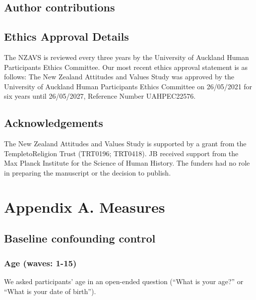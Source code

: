 \documentclass[
  singlecolumn]{report}
\begin{document}
\hypertarget{author-contributions}{%
\subsection{Author contributions}\label{author-contributions}}

\hypertarget{ethics-approval-details}{%
\subsection{Ethics Approval Details}\label{ethics-approval-details}}

The NZAVS is reviewed every three years by the University of Auckland
Human Participants Ethics Committee. Our most recent ethics approval
statement is as follows: The New Zealand Attitudes and Values Study was
approved by the University of Auckland Human Participants Ethics
Committee on 26/05/2021 for six years until 26/05/2027, Reference Number
UAHPEC22576.

\hypertarget{acknowledgements}{%
\subsection{Acknowledgements}\label{acknowledgements}}

The New Zealand Attitudes and Values Study is supported by a grant from
the TempletoReligion Trust (TRT0196; TRT0418). JB received support from
the Max Planck Institute for the Science of Human History. The funders
had no role in preparing the manuscript or the decision to publish.

\newpage{}

\hypertarget{appendix-a.-measures}{%
\section{Appendix A. Measures}\label{appendix-a.-measures}}

\hypertarget{baseline-confounding-control}{%
\subsection{Baseline confounding
control}\label{baseline-confounding-control}}

\hypertarget{age-waves-1-15}{%
\subsubsection{Age (waves: 1-15)}\label{age-waves-1-15}}

We asked participants' age in an open-ended question (``What is your
age?'' or ``What is your date of birth'').
\end{document}
